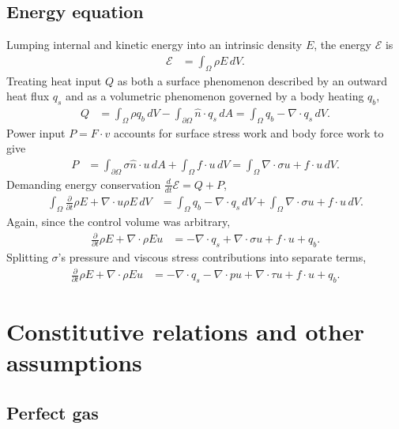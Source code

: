 \documentclass[letterpaper,11pt,nointlimits,reqno,draft]{amsbook}
\begin{document}
\subsection{Energy equation}
Lumping internal and kinetic energy into an intrinsic density $E$,
the energy $\mathscr{E}$ is
\begin{align}
  \mathscr{E} &= \int_{\Omega} \rho{}E \, dV
  .
\end{align}
Treating heat input $Q$ as both a surface phenomenon described by an outward
heat flux $q_{s}$ and as a volumetric phenomenon governed by a
body heating $q_{b}$,
\begin{align}
  Q
  &=
   \int_{\Omega}\rho{}q_{b}\,dV
  -\int_{\partial\Omega}\hat{n}\cdot{}q_{s}\,dA
  =
    \int_{\Omega}q_{b} - \nabla\cdot{}q_{s}\,dV
  .
\end{align}
Power input $P=F\cdot{}v$ accounts for surface stress work and body
force work to give
\begin{align}
  P
  &=
    \int_{\partial\Omega} \sigma{}\hat{n} \cdot{} u \, dA
  + \int_{\Omega} f \cdot{} u \, dV
  = \int_{\Omega} \nabla\cdot{}\sigma{}u + f \cdot{} u \, dV
  .
\end{align}
Demanding energy conservation $\frac{d}{dt}\mathscr{E}=Q+P$,
\begin{align}
  \int_{\Omega}\frac{\partial}{\partial{}t} \rho{}E
  +
  \nabla\cdot{}u\rho{}E
  \,dV
&=
    \int_{\Omega} q_{b} - \nabla\cdot{}q_{s}\,dV
  + \int_{\Omega} \nabla\cdot\sigma{}u + f \cdot{} u \, dV
  .
\end{align}
Again, since the control volume was arbitrary,
\begin{align}
  \frac{\partial}{\partial{}t} \rho{}E
  +
  \nabla\cdot{}\rho{}Eu
&=
  - \nabla\cdot{}q_{s}
  + \nabla\cdot\sigma{}u
  + f \cdot{} u
  + q_{b}
  .
\end{align}
Splitting $\sigma$'s pressure and viscous stress contributions into separate
terms,
\begin{align}
  \label{eq:cons_energy}
  \frac{\partial}{\partial{}t} \rho{}E
  +
  \nabla\cdot{}\rho{}Eu
&=
  - \nabla\cdot{}q_{s}
  - \nabla\cdot{}pu
  + \nabla\cdot{}\tau{}u
  + f \cdot{} u
  + q_{b}
  .
\end{align}

\section{Constitutive relations and other assumptions}
\label{sec:constitutive}

\subsection{Perfect gas}
\end{document}

